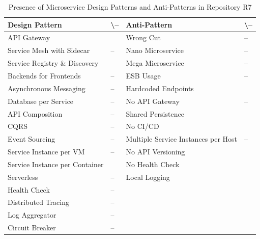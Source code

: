 \documentclass{Configuration_Files/PoliMi3i_thesis}
\newcommand{\cmark}{\ding{51}}%
\begin{document}
\begin{table}[H]
\centering 
    \begin{tabular}{ 
  | >{\centering\arraybackslash} m{16em} 
  | >{\centering\arraybackslash} m{2.2em} 
  | >{\centering\arraybackslash} m{16em} 
  | >{\centering\arraybackslash} m{2.2em} | }
    \hline
    \rowcolor{bluepoli!40}
    \textbf{Design Pattern} & \cmark \textbackslash – & \textbf{Anti-Pattern} & \cmark \textbackslash – \T\B \\
    \hline \hline
    API Gateway & \cmark & Wrong Cut & – \T\B\\
    \hline
    \rowcolor{bluepoli!10}
    Service Mesh with Sidecar & – & Nano Microservice & – \T\B \\
    \hline
    Service Registry \& Discovery & \cmark & Mega Microservice & – \T\B \\
    \hline
    \rowcolor{bluepoli!10}
    Backends for Frontends & – & ESB Usage & – \T\B \\
    \hline
    Asynchronous Messaging & – & Hardcoded Endpoints & \cmark \T\B \\
    \hline
    \rowcolor{bluepoli!10}
    Database per Service & – & No API Gateway & – \T\B \\
    \hline
    API Composition & – & Shared Persistence & \cmark \T\B \\
    \hline
    \rowcolor{bluepoli!10}
    CQRS & – & No CI/CD & \cmark \T\B \\
    \hline
    Event Sourcing & – & Multiple Service Instances per Host & – \T\B \\
    \hline
    \rowcolor{bluepoli!10}
    Service Instance per VM & – & No API Versioning & \cmark \T\B \\
    \hline
    Service Instance per Container & \cmark & No Health Check & \cmark \T\B \\
    \hline
    \rowcolor{bluepoli!10}
    Serverless & – & Local Logging & \cmark \T\B \\
    \hline
    Health Check & – &  & \T\B \\
    \hline
    \rowcolor{bluepoli!10}
    Distributed Tracing & – & & \T\B \\
    \hline
    Log Aggregator & – &  & \T\B \\
    \hline
    \rowcolor{bluepoli!10}
    Circuit Breaker & – &  & \T\B \\
    \hline
    \end{tabular}
    \\[10pt]
    \caption{Presence of Microservice Design Patterns and Anti-Patterns in Repository R7}
    \label{table:R7_result}
\end{table}
\end{document}
